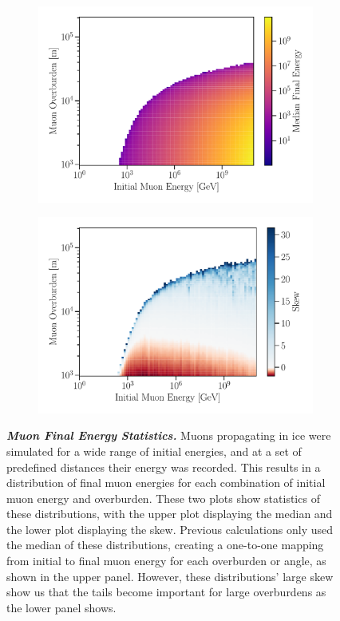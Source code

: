 \begin{figure}
	\centering
	\begin{subfigure}{\linewidth}
		\centering
		\includegraphics[width=0.8\linewidth]{figures/preach_median}
	\end{subfigure}
	\begin{subfigure}{\linewidth}
		\centering
		\includegraphics[width=0.8\linewidth]{figures/preach_skew}
	\end{subfigure}
	\caption{\textbf{\textit{Muon Final Energy Statistics.}} Muons propagating in ice were simulated for a wide range of initial energies, and at a set of predefined distances their energy was recorded.
		This results in a distribution of final muon energies for each combination of initial muon energy and overburden.
		These two plots show statistics of these distributions, with the upper plot displaying the median and the lower plot displaying the skew.
		Previous calculations only used the median of these distributions, creating a one-to-one mapping from initial to final muon energy for each overburden or angle, as shown in the upper panel.
		However, these distributions' large skew show us that the tails become important for large overburdens as the lower panel shows.
	}
	\label{fig:preach_stats}
\end{figure}

